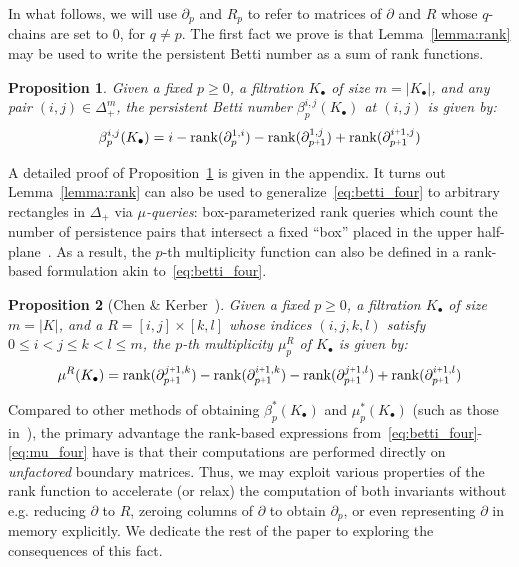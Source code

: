 \documentclass[10pt]{article}
\newcommand{\+}{%
	\raisebox{0.18ex}{\scaleobj{0.55}{+}}
}
\newtheorem{proposition}{Proposition}
\theoremstyle{definition}
\begin{document}
In what follows, we will use $\partial_p$ and $R_p$ to refer to matrices of $\partial$ and $R$ whose $q$-chains are set to $0$, for $q \neq p $. The first fact we prove is that Lemma~\ref{lemma:rank} may be used to write the persistent Betti number as a sum of rank functions. 
\begin{proposition}\label{prop:rank_reduction}
Given a fixed $p \geq 0$, a filtration $K_\bullet$ of size $m = \lvert K_\bullet \rvert$, and any pair $(i,j) \in \Delta_+^m$, the persistent Betti number $\beta_p^{i,j}(K_\bullet)$ at $(i,j)$ is given by:
	\begin{equation}\label{eq:betti_four}
	\beta_p^{i,j}(K_\bullet) = i - \mathrm{rank}(\partial_p^{1,i}) - \mathrm{rank}(\partial_{p\+1 }^{1,j}) + \mathrm{rank}(\partial_{p\+1}^{i \+ 1, j} )
	\end{equation}
\end{proposition}
\noindent A detailed proof of Proposition~\ref{prop:rank_reduction} is given in the appendix. It turns out Lemma~\ref{lemma:rank} can also be used to generalize~\eqref{eq:betti_four} to arbitrary rectangles in $\Delta_+$ via $\mu$\emph{-queries}: box-parameterized rank queries which count the number of persistence pairs that intersect a fixed ``box'' placed in the upper half-plane~\cite{chen2011output}. 
As a result, the $p$-th multiplicity function can also be defined in a rank-based formulation akin to~\eqref{eq:betti_four}. 
\begin{proposition}[Chen \& Kerber~\cite{chen2011output}]\label{prop:mu_reduction}
Given a fixed $p \geq 0$, a filtration $K_\bullet$ of size $m = \lvert K \rvert$, and a $R = [i,j] \times [k,l]$ whose indices $(i,j,k,l)$ satisfy $0 \leq i < j \leq k < l \leq m$, the $p$-th multiplicity $\mu_p^{R}$ of $K_\bullet$ is given by:
	\begin{equation}\label{eq:mu_four}
	\mu^{R}(K_\bullet) = \mathrm{rank}(\partial_{p\+1}^{j \+ 1, k})  - \mathrm{rank}(\partial_{p\+1}^{i \+ 1, k})  - \mathrm{rank}(\partial_{p\+1}^{j \+ 1, l}) + \mathrm{rank}(\partial_{p\+1}^{i \+ 1, l}) 
	\end{equation}
\end{proposition}
\noindent Compared to other methods of obtaining $\beta_p^{\ast}(K_\bullet)$ and $\mu_p^\ast(K_\bullet)$ (such as those in~\cite{edelsbrunner2022computational, zomorodian2004computing}), the primary advantage the rank-based expressions from~\eqref{eq:betti_four}-\eqref{eq:mu_four} have is that their computations are performed directly on \emph{unfactored} boundary matrices. Thus, we may exploit various properties of the rank function to accelerate (or relax) the computation of both invariants without e.g. reducing $\partial$ to $R$, zeroing columns of $\partial$ to obtain $\partial_p$, or even representing $\partial$ in memory explicitly. We dedicate the rest of the paper to exploring the consequences of this fact. 
\end{document}
